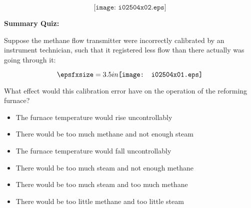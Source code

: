 
$$\texttt{[image: i02504x02.eps]}$$








\vfil \eject

\noindent
{\bf Summary Quiz:}

Suppose the methane flow transmitter were incorrectly calibrated by an instrument technician, such that it registered less flow than there actually was going through it:

$$\epsfxsize=3.5in \texttt{[image: i02504x01.eps]}$$

What effect would this calibration error have on the operation of the reforming furnace?

\begin{itemize}
\item{} The furnace temperature would rise uncontrollably
\vskip 5pt 
\item{} There would be too much methane and not enough steam
\vskip 5pt 
\item{} The furnace temperature would fall uncontrollably
\vskip 5pt 
\item{} There would be too much steam and not enough methane
\vskip 5pt 
\item{} There would be too much steam and too much methane
\vskip 5pt 
\item{} There would be too little methane and too little steam
\end{itemize}






